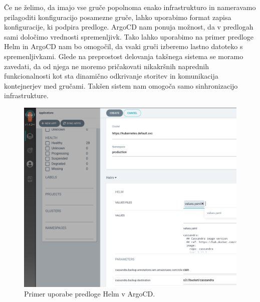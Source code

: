 \documentclass[a4paper, 12pt]{book}
\begin{document}
Če ne želimo, da imajo vse gruče popolnoma enako infrastrukturo in nameravamo prilagoditi konfiguracijo posamezne gruče, lahko uporabimo format zapisa konfiguracije, ki podpira predloge.
ArgoCD nam ponuja možnost, da v predlogah sami določimo vrednosti spremenljivk.
Tako lahko uporabimo na primer predloge Helm in ArgoCD nam bo omogočil, da vsaki gruči izberemo lastno datoteko s spremenljivkami.
Glede na preprostost delovanja takšnega sistema se moramo zavedati, da od njega ne moremo pričakovati nikakršnih naprednih funkcionalnosti kot sta dinamično odkrivanje storitev in komunikacija kontejnerjev med gručami.
Takšen sistem nam omogoča samo sinhronizacijo infrastrukture.

\begin{figure}[h]
\begin{center}
\includegraphics[width=1.0\textwidth]{images/primer-uporabe-helm-predloge-argo-cd.png}
\end{center}
\caption{Primer uporabe predloge Helm v ArgoCD.}
\label{primer-uporabe-helm-predloge-argo-cd}
\end{figure}
\end{document}

